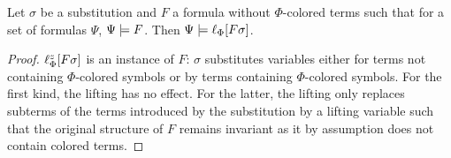 \documentclass[,%
	draft=false,%
	numbers=noendperiod
	11pt,
	a4paper,
	oneside,%
	openany,
]{memoir}
\begin{document}
\begin{lemma}
	\label{lemma:substitute_and_lift}
	Let $\sigma$ be a substitution and $F$ a formula without $\Phi$-colored terms such that for a set of formulas $\Psi$, $\Psi \models F$.
	Then $\Psi \models \ell_{\Phi}[F\sigma]$.
\end{lemma}
\begin{proof}
	$\ell_{\Phi}^{z}[F\sigma]$ is an instance of $F$:
	$\sigma$ substitutes variables either for terms not containing $\Phi$-colored symbols or by terms containing $\Phi$-colored symbols.
	For the first kind, the lifting has no effect.
	For the latter, the lifting only replaces subterms of the terms introduced by the substitution by a lifting variable such that the original structure of $F$ remains invariant as it by assumption does not contain colored terms.
\end{proof}
\end{document}

